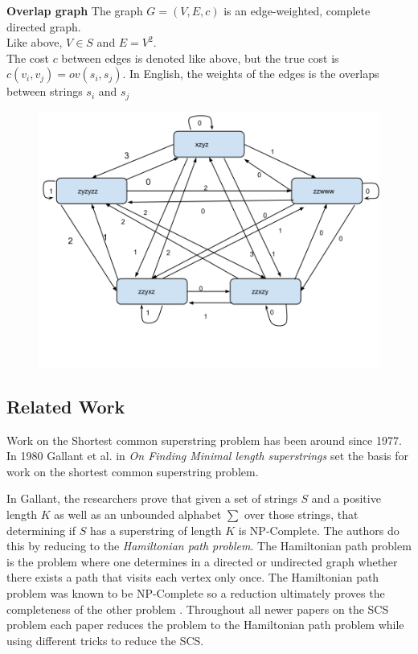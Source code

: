 \documentclass[letterpaper,11pt,titlepage]{article}
\begin{document}
\textbf{Overlap graph}
The graph $G = (V,E,c)$ is an edge-weighted, complete directed graph. \\
Like above, $V \in S$ and $E=V^2$.\\
The cost $c$ between edges is denoted like above, but the true cost is $c(v_i,v_j) = ov(s_i,s_j)$. In English, the weights of the edges is the overlaps between strings $s_i$ and $s_j$\\

\begin{figure}[h]
 \centering
   \includegraphics[width=.6\textwidth]{overlap.png}
\end{figure}


\newpage
\subsection{Related Work}
Work on the Shortest common superstring problem has been around since 1977. In 1980 Gallant et al. in \textit{On Finding Minimal length superstrings}\cite{gallant1980finding} set the basis for work on the shortest common superstring problem. 

In Gallant, the researchers prove that given a set of strings $S$ and a positive length $K$ as well as an unbounded alphabet $\sum$ over those strings, that determining if $S$ has a superstring of length $K$ is NP-Complete. The authors do this by reducing to the \textit{Hamiltonian  path problem}. The Hamiltonian path problem is the problem where one determines in a directed or undirected graph whether there exists a path that visits each vertex only once. The Hamiltonian path problem was known to be NP-Complete so a reduction ultimately proves the completeness of the other problem \cite{michael1979computers}. Throughout all newer papers on the SCS problem each paper reduces the problem to the Hamiltonian path problem while using different tricks to reduce the SCS.\\
\end{document}
